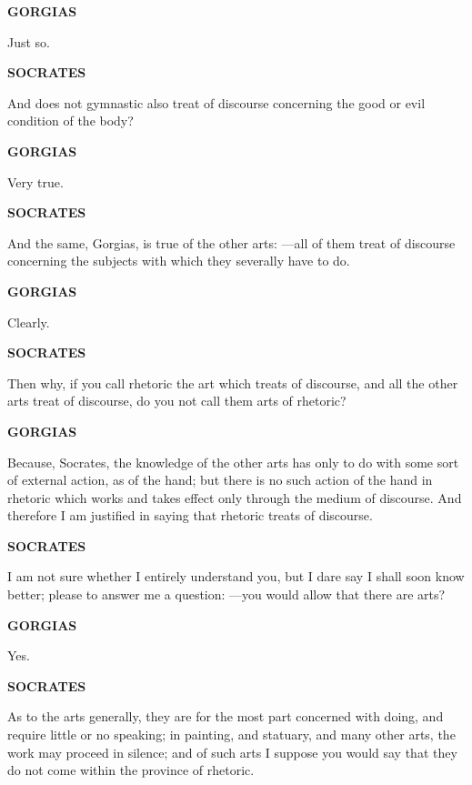 \documentclass[11pt,letter]{article}
\begin{document}
\par \textbf{GORGIAS}
\par   Just so.

\par \textbf{SOCRATES}
\par   And does not gymnastic also treat of discourse concerning the good or evil condition of the body?

\par \textbf{GORGIAS}
\par   Very true.

\par \textbf{SOCRATES}
\par   And the same, Gorgias, is true of the other arts: —all of them treat of discourse concerning the subjects with which they severally have to do.

\par \textbf{GORGIAS}
\par   Clearly.

\par \textbf{SOCRATES}
\par   Then why, if you call rhetoric the art which treats of discourse, and all the other arts treat of discourse, do you not call them arts of rhetoric?

\par \textbf{GORGIAS}
\par   Because, Socrates, the knowledge of the other arts has only to do with some sort of external action, as of the hand; but there is no such action of the hand in rhetoric which works and takes effect only through the medium of discourse. And therefore I am justified in saying that rhetoric treats of discourse.

\par \textbf{SOCRATES}
\par   I am not sure whether I entirely understand you, but I dare say I shall soon know better; please to answer me a question: —you would allow that there are arts?

\par \textbf{GORGIAS}
\par   Yes.

\par \textbf{SOCRATES}
\par   As to the arts generally, they are for the most part concerned with doing, and require little or no speaking; in painting, and statuary, and many other arts, the work may proceed in silence; and of such arts I suppose you would say that they do not come within the province of rhetoric.
\end{document}
